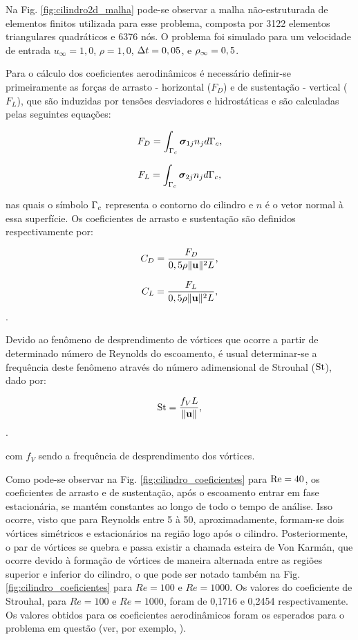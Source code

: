 \documentclass[tese_patricia]{subfiles}%
\begin{document}
Na Fig. \ref{fig:cilindro2d_malha} pode-se observar a malha não-estruturada de elementos finitos utilizada para esse problema, composta por 3122 elementos triangulares quadráticos e 6376 nós. O problema foi simulado para um velocidade de entrada $u_{\infty} = 1,0$, $\rho = 1,0$, $\Delta t = 0,05$, e $\rho_\infty = 0,5$. 

Para o cálculo dos coeficientes aerodinâmicos é necessário definir-se primeiramente as forças de arrasto - horizontal ($F_D$) e de sustentação - vertical ($F_L$), que são induzidas por tensões desviadores e hidrostáticas e são calculadas pelas seguintes equações:

\begin{align}
F_D = \int_{\Gamma_{c}} \boldsymbol{\sigma}_{1j}n_{j} d\Gamma_{c},
\end{align}

\begin{align}
F_L = \int_{\Gamma_{c}} \boldsymbol{\sigma}_{2j}n_{j} d\Gamma_{c},
\end{align}

\noindent nas quais o símbolo $\Gamma_{c}$ representa o contorno do cilindro e $n$ é o vetor normal à essa superfície. Os coeficientes de arrasto e sustentação são definidos respectivamente por:

\begin{align}
	C_D = \frac{F_D}{0,5\rho \lVert \mathbf{u} \lVert^{2} L},
\end{align}

\begin{align}
	C_L = \frac{F_L}{0,5\rho \lVert \mathbf{u} \lVert^{2} L},
\end{align}.

Devido ao fenômeno de desprendimento de vórtices que ocorre a partir de determinado número de Reynolds do escoamento, é usual determinar-se a frequência deste fenômeno através do número adimensional de Strouhal ($\mathrm{St}$), dado por:

\begin{align}
	\mathrm{St} = \frac{f_{V}L}{\lVert \mathbf{u} \lVert},
\end{align}.

\noindent com $f_{V}$ sendo a frequência de desprendimento dos vórtices.

Como pode-se observar na Fig. \ref{fig:cilindro_coeficientes} para $\mathrm{Re} = 40$, os coeficientes de arrasto e de sustentação, após o escoamento entrar em fase estacionária, se mantém constantes ao longo de todo o tempo de análise. Isso ocorre, visto que para Reynolds entre 5 à 50, aproximadamente, formam-se dois vórtices simétricos e estacionários na região logo após o cilindro. Posteriormente, o par de vórtices se quebra e passa existir a chamada esteira de Von Karmán, que ocorre devido à formação de vórtices de maneira alternada entre as regiões superior e inferior do cilindro, o que pode ser notado também na Fig. \ref{fig:cilindro_coeficientes}  para $Re = 100$ e $Re=1000$. Os valores do coeficiente de Strouhal, para $Re = 100$ e $Re=1000$, foram de 0,1716 e 0,2454 respectivamente. Os valores obtidos para os coeficientes aerodinâmicos foram os esperados para o problema em questão (ver, por exemplo, ).
\end{document}
